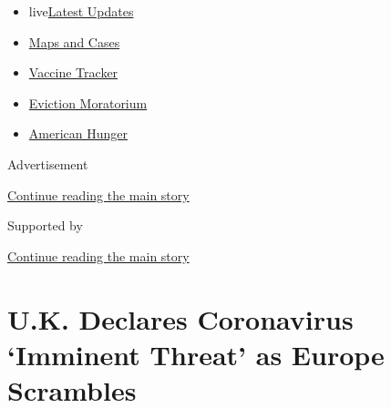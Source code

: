 \begin{itemize}
\tightlist
\item
  live\href{https://www.nytimes3xbfgragh.onion/2020/09/08/world/covid-19-coronavirus.html?name=styln-coronavirus-national\&region=TOP_BANNER\&block=storyline_menu_recirc\&action=click\&pgtype=Article\&impression_id=92fad310-f1ce-11ea-b607-5f01091b4cf2\&variant=undefined}{Latest
  Updates}
\item
  \href{https://www.nytimes3xbfgragh.onion/interactive/2020/us/coronavirus-us-cases.html?name=styln-coronavirus-national\&region=TOP_BANNER\&block=storyline_menu_recirc\&action=click\&pgtype=Article\&impression_id=92fad311-f1ce-11ea-b607-5f01091b4cf2\&variant=undefined}{Maps
  and Cases}
\item
  \href{https://www.nytimes3xbfgragh.onion/interactive/2020/science/coronavirus-vaccine-tracker.html?name=styln-coronavirus-national\&region=TOP_BANNER\&block=storyline_menu_recirc\&action=click\&pgtype=Article\&impression_id=92fad312-f1ce-11ea-b607-5f01091b4cf2\&variant=undefined}{Vaccine
  Tracker}
\item
  \href{https://www.nytimes3xbfgragh.onion/2020/09/02/your-money/eviction-moratorium-covid.html?name=styln-coronavirus-national\&region=TOP_BANNER\&block=storyline_menu_recirc\&action=click\&pgtype=Article\&impression_id=92fad313-f1ce-11ea-b607-5f01091b4cf2\&variant=undefined}{Eviction
  Moratorium}
\item
  \href{https://www.nytimes3xbfgragh.onion/interactive/2020/09/02/magazine/food-insecurity-hunger-us.html?name=styln-coronavirus-national\&region=TOP_BANNER\&block=storyline_menu_recirc\&action=click\&pgtype=Article\&impression_id=92fad314-f1ce-11ea-b607-5f01091b4cf2\&variant=undefined}{American
  Hunger}
\end{itemize}

Advertisement

\protect\hyperlink{after-top}{Continue reading the main story}

Supported by

\protect\hyperlink{after-sponsor}{Continue reading the main story}

\hypertarget{uk-declares-coronavirus-imminent-threat-as-europe-scrambles}{%
\section{U.K. Declares Coronavirus `Imminent Threat' as Europe
Scrambles}\label{uk-declares-coronavirus-imminent-threat-as-europe-scrambles}}

